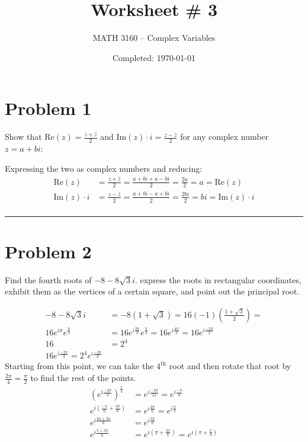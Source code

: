 \documentclass{article}
\title{Worksheet \# 3}
\author{
  MATH 3160 -- Complex Variables\\
  \myauthor
}
\date{Completed: \today}
\begin{document}
\maketitle %


\section*{Problem 1}
Show that Re$(z) = \frac{z+\bar z}{2}$ and Im$(z)\cdot i = \frac{z-\bar z}{2}$ for any complex number $z = a+bi$:

Expressing the two as complex numbers and reducing:
\begin{align*}
\text{Re}(z) &= \frac{z+\bar z}{2} = \frac{a+bi+a-bi}{2} = \frac{2a}{2} = a = \text{Re}(z) \\
\text{Im}(z)\cdot i &= \frac{z-\bar z}{2} = \frac{a+bi-a+bi}{2} = \frac{2bi}{2} = bi = \text{Im}(z)\cdot i \\
\end{align*}

\hrule %

\newpage
\section*{Problem 2}
Find the fourth roots of $-8-8\sqrt{3}i$. express the roots in rectangular coordinates, exhibit them as the vertices of a certain square, and point out the principal root.

\begin{align*}
  -8 -8\sqrt{3}i &= -8(1+\sqrt{3}) = 16(-1)\left(\frac{1+\sqrt{3}}{2}\right) =\\
  16e^{i\pi}e^{\frac{\pi}{3}} &= 16e^{i\frac{3\pi}{3}}e^{\frac{\pi}{3}} = 16e^{i\frac{4\pi}{3}} = 16e^{i\frac{-2\pi}{3}} \\
  16 &= 2^4 \\
  16e^{i\frac{-2\pi}{3}} = 2^4e^{i\frac{-2\pi}{3}}
\end{align*}
Starting from this point, we can take the $4^{\text{th}}$ root and then rotate that root by $\frac{2\pi}{4} = \frac{\pi}{2}$ to find the rest of the points.
\begin{align*}
  (e^{i\frac{-2\pi}{3}})^{\frac{1}{4}} &= e^{i\frac{-2\pi}{12}}= e^{i\frac{-\pi}{6}}\\
  e^{i(\frac{-\pi}{6} + \frac{3\pi}{6})} &= e^{i\frac{2\pi}{6}} = e^{i\frac{\pi}{3}}\\
  e^{i\frac{2\pi+3\pi}{6}} &= e^{i\frac{5\pi}{6}} \\
  e^{i\frac{5+3\pi}{6}} &= e^{i\left(\pi + \frac{2\pi}{6}\right)} = e^{i\left(\pi + \frac{\pi}{3}\right)} 
\end{align*}
\end{document}
